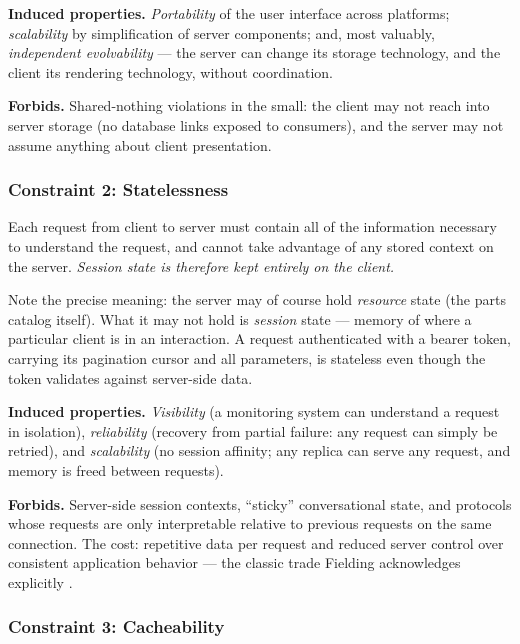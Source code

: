 \textbf{Induced properties.} \emph{Portability} of the user interface across
platforms; \emph{scalability} by simplification of server components; and, most
valuably, \emph{independent evolvability} --- the server can change its storage
technology, and the client its rendering technology, without coordination.

\textbf{Forbids.} Shared-nothing violations in the small: the client may not reach
into server storage (no database links exposed to consumers), and the server may
not assume anything about client presentation.

\subsubsection{Constraint 2: Statelessness}

\begin{definition}
Each request from client to server must contain all of the information necessary
to understand the request, and cannot take advantage of any stored context on the
server. \emph{Session state is therefore kept entirely on the client.}
\end{definition}

Note the precise meaning: the server may of course hold \emph{resource} state (the
parts catalog itself). What it may not hold is \emph{session} state --- memory of
where a particular client is in an interaction. A request authenticated with a
bearer token, carrying its pagination cursor and all parameters, is stateless even
though the token validates against server-side data.

\textbf{Induced properties.} \emph{Visibility} (a monitoring system can understand
a request in isolation), \emph{reliability} (recovery from partial failure: any
request can simply be retried), and \emph{scalability} (no session affinity; any
replica can serve any request, and memory is freed between requests).

\textbf{Forbids.} Server-side session contexts, ``sticky'' conversational state,
and protocols whose requests are only interpretable relative to previous requests
on the same connection. The cost: repetitive data per request and reduced server
control over consistent application behavior --- the classic trade Fielding
acknowledges explicitly \cite{fielding2000rest}.

\subsubsection{Constraint 3: Cacheability}

